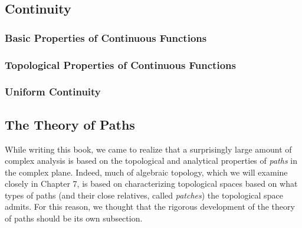\subsection{Continuity}
\subsubsection{Basic Properties of Continuous Functions}
\subsubsection{Topological Properties of Continuous Functions}
\subsubsection{Uniform Continuity}
\subsection{The Theory of Paths}
While writing this book, we came to realize that a surprisingly large amount of complex analysis is based on the topological and analytical properties of \emph{paths} in the complex plane. Indeed, much of algebraic topology, which we will examine closely in Chapter 7, is based on characterizing topological spaces based on what types of paths (and their close relatives, called \emph{patches}) the topological space admits. For this reason, we thought that the rigorous development of the theory of paths should be its own subsection.
